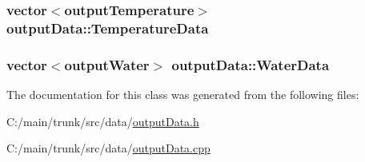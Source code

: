 \label{classoutput_data_aa4e17ffda4c4dde9a0796d35707f6067}
\hypertarget{classoutput_data_a3e8cb56e571046aa8b37a4260a062594}{
\subsubsection[{TemperatureData}]{\setlength{\rightskip}{0pt plus 5cm}vector$<${\bf outputTemperature}$>$ {\bf outputData::TemperatureData}}}
\label{classoutput_data_a3e8cb56e571046aa8b37a4260a062594}
\hypertarget{classoutput_data_a354085135b0a0a2b6bb245dff6779073}{
\subsubsection[{WaterData}]{\setlength{\rightskip}{0pt plus 5cm}vector$<${\bf outputWater}$>$ {\bf outputData::WaterData}}}
\label{classoutput_data_a354085135b0a0a2b6bb245dff6779073}


The documentation for this class was generated from the following files:\begin{DoxyCompactItemize}
\item 
C:/main/trunk/src/data/\hyperlink{output_data_8h}{outputData.h}\item 
C:/main/trunk/src/data/\hyperlink{output_data_8cpp}{outputData.cpp}\end{DoxyCompactItemize}

